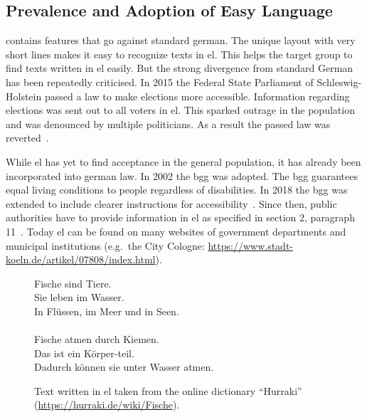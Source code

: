 \subsection{Prevalence and Adoption of Easy Language}\label{subsec:el-adop}

 contains features that go against standard german.
The unique layout with very short lines makes it easy to recognize texts in \gls{el}.
This helps the target group to find texts written in \gls{el} easily.
But the strong divergence from standard German has been repeatedly criticised.
In 2015 the Federal State Parliament of Schleswig-Holstein passed a law to make elections more accessible.
Information regarding elections was sent out to all voters in \gls{el}.
This sparked outrage in the population and was denounced by multiple politicians.
As a result the passed law was reverted~\autocite{easyLanguageBook}.

While \gls{el} has yet to find acceptance in the general population, it has already been incorporated into german law.
In 2002 the \gls{bgg} was adopted.
The \gls{bgg} guarantees equal living conditions to people regardless of disabilities.
In 2018 the \gls{bgg} was extended to include clearer instructions for accessibility~\autocite{bggInfo}.
Since then, public authorities have to provide information in \gls{el} as specified in section 2, paragraph 11~\autocite{bgg2018}.
Today \gls{el} can be found on many websites of government departments and municipal institutions (e.g.\ the City Cologne: \url{https://www.stadt-koeln.de/artikel/07808/index.html}).

\begin{figure}
    \centering
    \colorbox{goodgreen!20}{
        \begin{minipage}{0.6\textwidth}
            Fische sind Tiere. \\
            Sie leben im Wasser. \\
            In Flüssen, im Meer und in Seen. \\
            \\
            Fische atmen durch Kiemen. \\
            Das ist ein Körper-teil. \\
            Dadurch können sie unter Wasser atmen.
        \end{minipage}
    }
    \caption[Text written in .]{Text written in \gls{el} taken from the online dictionary \enquote{Hurraki} (\url{https://hurraki.de/wiki/Fische}).}
    \label{fig:easy_text}
\end{figure}


